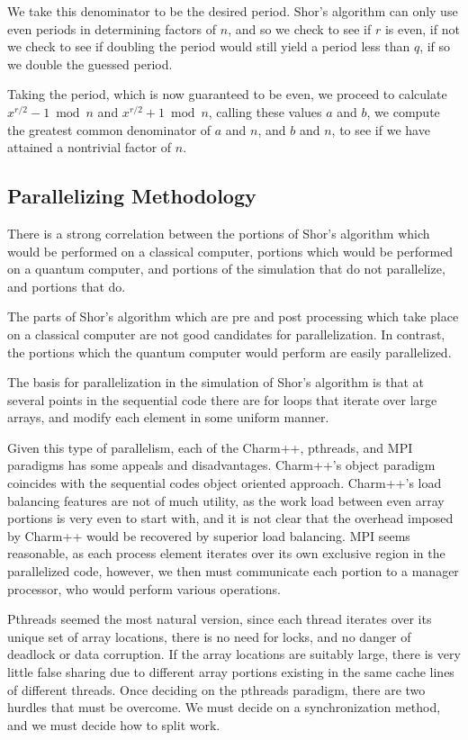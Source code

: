 \documentclass[]{article}
\begin{document}
We take this denominator to be the desired period. Shor's algorithm
can only use even periods in determining factors of $n$, and so we
check to see if $r$ is even, if not we check to see if doubling the
period would still yield a period less than $q$, if so we double the
guessed period.

Taking the period, which is now guaranteed to be even, we proceed to
calculate $x^{r/2} - 1 \bmod n$ and $x^{r/2} + 1 \bmod n$, calling
these values $a$ and $b$, we compute the greatest common denominator
of $a$ and $n$, and $b$ and $n$, to see if we have attained a
nontrivial factor of $n$.

\subsection{Parallelizing Methodology}

There is a strong correlation between the portions of Shor's algorithm
which would be performed on a classical computer, portions which would
be performed on a quantum computer, and portions of the simulation
that do not parallelize, and portions that do.  

The parts of Shor's algorithm which are pre and post processing which
take place on a classical computer are not good candidates for
parallelization.  In contrast, the portions which the quantum computer
would perform are easily parallelized.  

The basis for parallelization in the simulation of Shor's algorithm is
that at several points in the sequential code there are for loops that
iterate over large arrays, and modify each element in some uniform
manner.

Given this type of parallelism, each of the Charm++, pthreads, and MPI
paradigms has some appeals and disadvantages.  Charm++'s object
paradigm coincides with the sequential codes object oriented approach.
Charm++'s load balancing features are not of much utility, as the work
load between even array portions is very even to start with, and it is
not clear that the overhead imposed by Charm++ would be recovered by
superior load balancing.  MPI seems reasonable, as each process element
iterates over its own exclusive region in the parallelized code,
however, we then must communicate each portion to a manager processor,
who would perform various operations.  

Pthreads seemed the most natural version, since each thread iterates
over its unique set of array locations, there is no need for locks,
and no danger of deadlock or data corruption.  If the array locations
are suitably large, there is very little false sharing due to
different array portions existing in the same cache lines of different
threads.  Once deciding on the pthreads paradigm, there are two
hurdles that must be overcome.  We must decide on a synchronization
method, and we must decide how to split work.
\end{document}
